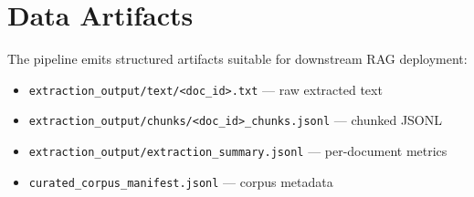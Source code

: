 \section{Data Artifacts}
The pipeline emits structured artifacts suitable for downstream RAG deployment:
\begin{itemize}[leftmargin=*]
  \item \texttt{extraction\_output/text/<doc\_id>.txt} --- raw extracted text
  \item \texttt{extraction\_output/chunks/<doc\_id>\_chunks.jsonl} --- chunked JSONL
  \item \texttt{extraction\_output/extraction\_summary.jsonl} --- per-document metrics
  \item \texttt{curated\_corpus\_manifest.jsonl} --- corpus metadata
\end{itemize}
